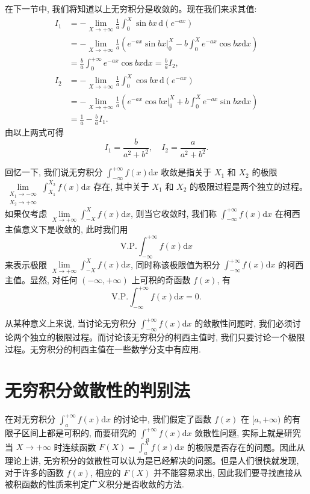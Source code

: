 \begin{solve}
在下一节中, 我们将知道以上无穷积分是收敛的。现在我们来求其值:
\[
\begin{aligned}
  I_1
  &=
  -\lim_{X\to+\infty}\frac1a\int_0^X\sin bx\,\mathrm d(e^{-ax})\\
  &=
  -\lim_{X\to+\infty}\frac1a\left(e^{-ax}\sin bx\big|_0^X
  -
  b\int_0^X e^{-ax}\cos bx\mathrm dx\right)\\
  &=
  \frac ba\int_0^{+\infty}e^{-ax}\cos bx\mathrm dx
  =
  \frac ba I_2,
\end{aligned}
\]
\[
\begin{aligned}
  I_2
  &=
  -\lim_{X\to+\infty}\frac1a\int_0^X\cos bx\,\mathrm d(e^{-ax})\\
  &=
  -\lim_{X\to+\infty}\frac1a\left(e^{-ax}\cos bx\big|_0^X
  +
  b\int_0^X e^{-ax}\sin bx\mathrm dx\right)\\
  &=
  \frac1a-\frac ba I_1.
\end{aligned}
\]
由以上两式可得
\[
  I_1=\frac b{a^2+b^2},\quad I_2=\frac a{a^2+b^2}.
\]

回忆一下, 我们说无穷积分 $\int_{-\infty}^{+\infty}f(x)\mathrm dx$ 收敛是指关于 $X_1$ 和 $X_2$ 的极限 $\lim\limits_{\substack{X_1\to-\infty\\ X_2\to+\infty}}\int_{X_1}^{X_2}f(x)\mathrm dx$ 存在, 其中关于 $X_1$ 和 $X_2$ 的极限过程是两个独立的过程。如果仅考虑 $\lim\limits_{X\to+\infty}\int_{-X}^X f(x)\mathrm dx$, 则当它收敛时, 我们称 $\int_{-\infty}^{+\infty}f(x)\mathrm dx$ 在柯西主值意义下是收敛的, 此时我们用
\[
  \mathrm{V.P.}\int_{-\infty}^{+\infty}f(x)\mathrm dx
\]
来表示极限 $\lim\limits_{X\to+\infty}\int_{-X}^X f(x)\mathrm dx$, 同时称该极限值为积分 $\int_{-\infty}^{+\infty}f(x)\mathrm dx$ 的柯西主值。显然, 对任何 $(-\infty,+\infty)$ 上可积的奇函数 $f(x)$, 有
\[
  \mathrm{V.P.}\int_{-\infty}^{+\infty}f(x)\mathrm dx=0.
\]

从某种意义上来说, 当讨论无穷积分 $\int_{-\infty}^{+\infty}f(x)\mathrm dx$ 的敛散性问题时, 我们必须讨论两个独立的极限过程。而讨论该无穷积分的柯西主值时, 我们只要讨论一个极限过程。无穷积分的柯西主值在一些数学分支中有应用.
\end{solve}


\section{无穷积分敛散性的判别法}
\label{sec:ma-8-2}

在对无穷积分 $\int_a^{+\infty}f(x)\mathrm dx$ 的讨论中, 我们假定了函数 $f(x)$ 在 $[a,+\infty)$ 的有限子区间上都是可积的, 而要研究的 $\int_a^{+\infty}f(x)\mathrm dx$ 敛散性问题, 实际上就是研究当 $X\to+\infty$ 时连续函数 $F(X)=\int_a^X f(x)\mathrm dx$ 的极限是否存在的问题。因此从理论上讲, 无穷积分的敛散性可以认为是已经解决的问题。但是人们很快就发现, 对于许多的函数 $f(x)$, 相应的 $F(X)$ 并不能容易求出, 因此我们要寻找直接从被积函数的性质来判定广义积分是否收敛的方法.

